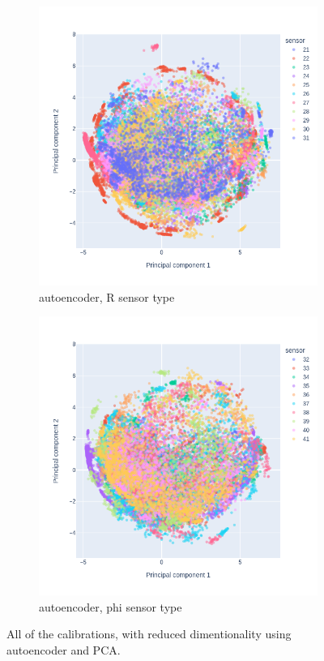 \begin{figure}
\begin{subfigure}[b]{0.45\textwidth}
    \centering
    \includegraphics[width=\linewidth]{figures/chapter4/dimred/PCA_pedestals_r_phi_2.png}
\caption{autoencoder, R sensor type}
    \label{plot:PCA_pedestals_2}
  \end{subfigure}
\begin{subfigure}[b]{0.45\textwidth}
    \centering
    \includegraphics[width=\linewidth]{figures/chapter4/dimred/PCA_pedestals_r_phi_3.png}
\caption{autoencoder, phi sensor type}
   \label{plot:PCA_pedestals_3}
  \end{subfigure}

    \caption[All calibrationd]{All of the calibrations, with reduced dimentionality using autoencoder and PCA.}
    \label{plot:pca_all_ped}
\end{figure}

